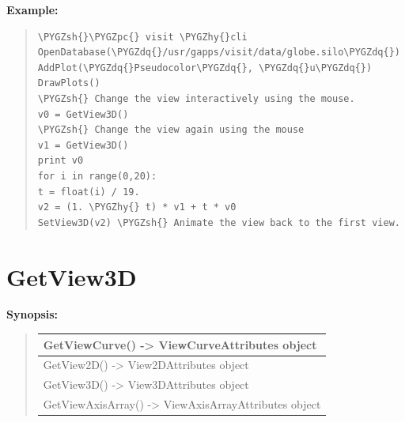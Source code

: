 \documentclass[letterpaper,10pt,english]{sphinxmanual}
\def\PYGZsh{\char`\#}
\def\PYGZpc{\char`\%}
\def\PYGZhy{\char`\-}
\def\PYGZdq{\char`\"}
\begin{document}
\begin{DUlineblock}{0em}
\item[] \textbf{Example:}
\item[] 
\end{DUlineblock}
\begin{quote}

\begin{Verbatim}[commandchars=\\\{\}]
\PYGZsh{}\PYGZpc{} visit \PYGZhy{}cli
OpenDatabase(\PYGZdq{}/usr/gapps/visit/data/globe.silo\PYGZdq{})
AddPlot(\PYGZdq{}Pseudocolor\PYGZdq{}, \PYGZdq{}u\PYGZdq{})
DrawPlots()
\PYGZsh{} Change the view interactively using the mouse.
v0 = GetView3D()
\PYGZsh{} Change the view again using the mouse
v1 = GetView3D()
print v0
for i in range(0,20):
t = float(i) / 19.
v2 = (1. \PYGZhy{} t) * v1 + t * v0
SetView3D(v2) \PYGZsh{} Animate the view back to the first view.
\end{Verbatim}
\end{quote}


\section{GetView3D}
\label{functions:getview3d}
\begin{DUlineblock}{0em}
\item[] \textbf{Synopsis:}
\end{DUlineblock}
\begin{quote}

\begin{tabulary}{\linewidth}{|L|}
\hline

GetViewCurve() -\textgreater{} ViewCurveAttributes object
\\
\hline
GetView2D() -\textgreater{} View2DAttributes object
\\
\hline
GetView3D() -\textgreater{} View3DAttributes object
\\
\hline
GetViewAxisArray() -\textgreater{} ViewAxisArrayAttributes object
\\
\hline\end{tabulary}

\end{quote}
\end{document}

